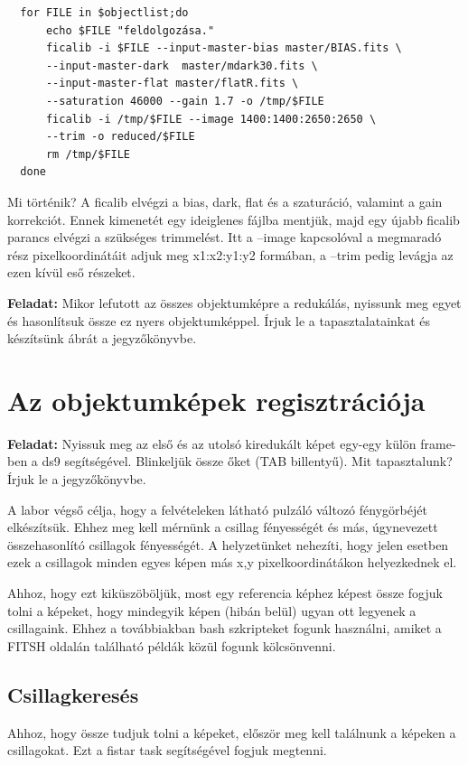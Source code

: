 \documentclass{article}
\begin{document}
\begin{verbatim}
  for FILE in $objectlist;do
      echo $FILE "feldolgozása."
      ficalib -i $FILE --input-master-bias master/BIAS.fits \
      --input-master-dark  master/mdark30.fits \
      --input-master-flat master/flatR.fits \
      --saturation 46000 --gain 1.7 -o /tmp/$FILE
      ficalib -i /tmp/$FILE --image 1400:1400:2650:2650 \
      --trim -o reduced/$FILE
      rm /tmp/$FILE
  done
\end{verbatim}

Mi történik? A ficalib elvégzi a bias, dark, flat és a szaturáció, valamint a
gain korrekciót. Ennek kimenetét egy ideiglenes fájlba mentjük, majd egy újabb
ficalib parancs elvégzi a szükséges trimmelést. Itt a --image kapcsolóval a
megmaradó rész pixelkoordinátáit adjuk meg x1:x2:y1:y2 formában, a --trim pedig
levágja az  ezen kívül eső részeket.

{\bf Feladat:}
Mikor lefutott az összes objektumképre a redukálás, nyissunk meg egyet és
hasonlítsuk össze ez nyers objektumképpel. Írjuk le a tapasztalatainkat és
készítsünk ábrát a jegyzőkönyvbe.

\section{Az objektumképek regisztrációja}

{\bf Feladat:}
Nyissuk meg az első és az utolsó kiredukált képet egy-egy külön frame-ben a ds9
segítségével. Blinkeljük össze őket (TAB billentyű). Mit tapasztalunk? Írjuk le
a jegyzőkönyvbe.

A labor végső célja, hogy a felvételeken látható pulzáló változó fénygörbéjét
elkészítsük. Ehhez meg kell mérnünk a csillag fényességét és más, úgynevezett
összehasonlító csillagok fényességét. A helyzetünket nehezíti, hogy jelen
esetben ezek a csillagok minden egyes képen más x,y pixelkoordinátákon
helyezkednek el.

Ahhoz, hogy ezt kiküszöböljük, most egy referencia képhez képest össze fogjuk
tolni a képeket, hogy mindegyik képen (hibán belül) ugyan ott legyenek a
csillagaink. Ehhez a továbbiakban bash szkripteket fogunk használni, amiket a
FITSH oldalán található példák közül fogunk kölcsönvenni.

\subsection{Csillagkeresés}

Ahhoz, hogy össze tudjuk tolni a képeket, először meg kell találnunk a képeken a
csillagokat. Ezt a fistar task segítségével fogjuk megtenni.
\end{document}
